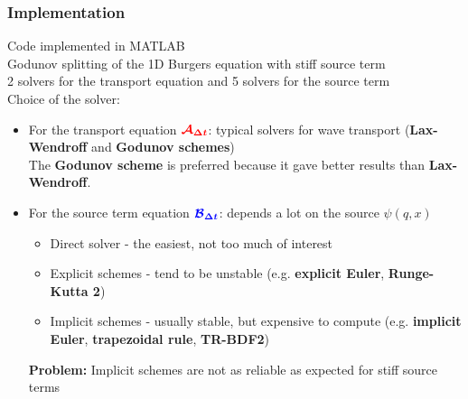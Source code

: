 \begin{frame}
    \frametitle{Implementation}
    Code implemented in MATLAB \\
    Godunov splitting of the 1D Burgers equation with stiff source term  \\ 
    2 solvers for the transport equation and 5 solvers for the source term \\
    Choice of the solver: \\ \pause
    \begin{itemize}
        \item For the transport equation ${\color{red}\bm{\mathcal{A}_{\Delta t}}}$: typical solvers for wave transport (\textbf{Lax-Wendroff} and \textbf{Godunov schemes}) \\
        The \textbf{Godunov scheme} is preferred because it gave better results than \textbf{Lax-Wendroff}. \pause
        \item For the source term equation ${\color{blue}\bm{\mathcal{B}_{\Delta t}}}$: depends a lot on the source $\psi(q,x)$ 
        \begin{itemize}
            \item Direct solver - the easiest, not too much of interest
            \item Explicit schemes - tend to be unstable (e.g. \textbf{explicit Euler}, \textbf{Runge-Kutta 2})
            \item Implicit schemes - usually stable, but expensive to compute (e.g. \textbf{implicit Euler}, \textbf{trapezoidal rule}, \textbf{TR-BDF2})
        \end{itemize}{}
        \vspace{2cm}
        \textbf{Problem: }Implicit schemes are not as reliable as expected for stiff source terms
    \end{itemize}{}
\end{frame}{}





